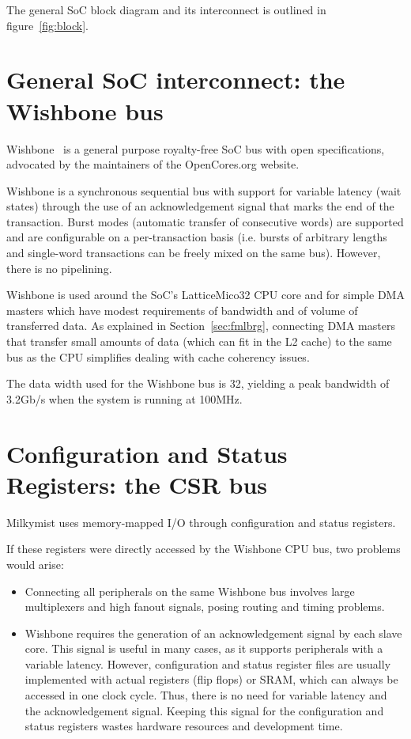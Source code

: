 \documentclass[a4paper,11pt]{kthesis}
\begin{document}
The general SoC block diagram and its interconnect is outlined in figure~\ref{fig:block}.

\section{General SoC interconnect: the Wishbone bus}
Wishbone~\cite{wishbone} is a general purpose royalty-free SoC bus with open specifications, advocated by the maintainers of the OpenCores.org website.

Wishbone is a synchronous sequential bus with support for variable latency (wait states) through the use of an acknowledgement signal that marks the end of the transaction. Burst modes (automatic transfer of consecutive words) are supported and are configurable on a per-transaction basis (i.e. bursts of arbitrary lengths and single-word transactions can be freely mixed on the same bus). However, there is no pipelining.

Wishbone is used around the SoC's LatticeMico32 CPU core and for simple DMA masters which have modest requirements of bandwidth and of volume of transferred data. As explained in Section~\ref{sec:fmlbrg}, connecting DMA masters that transfer small amounts of data (which can fit in the L2 cache) to the same bus as the CPU simplifies dealing with cache coherency issues.

The data width used for the Wishbone bus is 32, yielding a peak bandwidth of 3.2Gb/s when the system is running at 100MHz.

\section{Configuration and Status Registers: the CSR bus}
Milkymist uses memory-mapped I/O through configuration and status registers.

If these registers were directly accessed by the Wishbone CPU bus, two problems would arise:
\begin{itemize}
\item Connecting all peripherals on the same Wishbone bus involves large multiplexers and high fanout signals, posing routing and timing problems.
\item Wishbone requires the generation of an acknowledgement signal by each slave core. This signal is useful in many cases, as it supports peripherals with a variable latency. However, configuration and status register files are usually implemented with actual registers (flip flops) or SRAM, which can always be accessed in one clock cycle. Thus, there is no need for variable latency and the acknowledgement signal. Keeping this signal for the configuration and status registers wastes hardware resources and development time.
\end{itemize}
\end{document}
